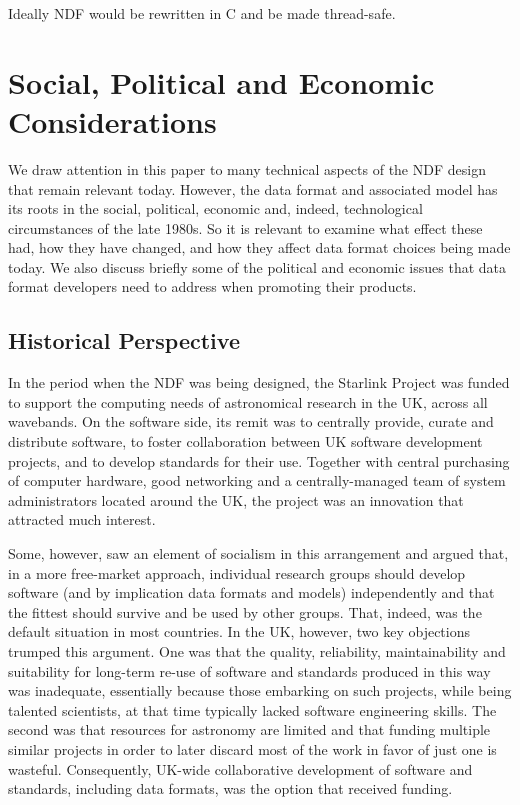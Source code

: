 \documentclass[final,authoryear,5p,times,twocolumn]{elsarticle}
\begin{document}
Ideally NDF would be rewritten in C and be made thread-safe.

\section{Social, Political and Economic Considerations}
\label{sec:social}

We draw attention in this paper to many technical aspects of the NDF
design that remain relevant today. However, the data format and
associated model has its
roots in the social, political, economic and, indeed, technological
circumstances of the late 1980s. So it is relevant to examine what
effect these had, how they have changed, and how they affect data
format choices being made today. We also discuss briefly some of the
political and economic issues that data format developers need to
address when promoting their products.

\subsection{Historical Perspective}

In the period when the NDF was being designed, the Starlink Project
was funded to support the computing needs of astronomical research in
the UK, across all wavebands. On the software side, its remit was to
centrally provide, curate and distribute software, to foster
collaboration between UK software development projects, and to develop
standards for their use. Together with central purchasing of computer
hardware, good networking and a centrally-managed team of system
administrators located around the UK, the project was an innovation
that attracted much interest.

Some, however, saw an element of socialism in this arrangement and
argued that, in a more free-market approach, individual research
groups should develop software (and by implication data formats and models)
independently and that the fittest should survive and be used by other
groups. That, indeed, was the default situation in most countries. In
the UK, however, two key objections trumped this argument. One was
that the quality, reliability, maintainability and suitability for
long-term re-use of software and standards produced in this way was
inadequate, essentially because those embarking on such projects,
while being talented scientists, at that time typically lacked software engineering
skills. The second was that resources for astronomy are limited and
that funding multiple similar projects in order to later discard most
of the work in favor of just one is wasteful. Consequently, UK-wide
collaborative development of software and standards, including data
formats, was the option that received funding.
\end{document}
